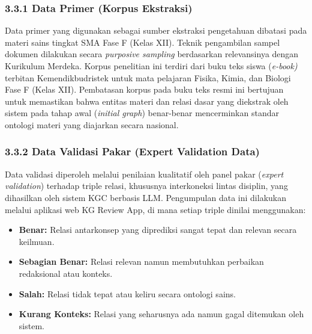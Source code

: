 \documentclass[
]{article}
\begin{document}
\hypertarget{section-3}{%
\subsubsection{\texorpdfstring{\hfill\break
}{ }}\label{section-3}}

\hypertarget{data-primer-korpus-ekstraksi}{%
\subsubsection{\texorpdfstring{\textbf{3.3.1} Data Primer (Korpus
Ekstraksi)
}{3.3.1 Data Primer (Korpus Ekstraksi) }}\label{data-primer-korpus-ekstraksi}}

Data primer yang digunakan sebagai sumber ekstraksi pengetahuan dibatasi
pada materi sains tingkat SMA Fase F (Kelas XII). Teknik pengambilan
sampel dokumen dilakukan secara \emph{purposive sampling} berdasarkan
relevansinya dengan Kurikulum Merdeka. Korpus penelitian ini terdiri
dari buku teks siswa (\emph{e-book)} terbitan Kemendikbudristek untuk
mata pelajaran Fisika, Kimia, dan Biologi Fase F (Kelas XII). Pembatasan
korpus pada buku teks resmi ini bertujuan untuk memastikan bahwa entitas
materi dan relasi dasar yang diekstrak oleh sistem pada tahap awal
(\emph{initial graph}) benar-benar mencerminkan standar ontologi materi
yang diajarkan secara nasional.

\hypertarget{data-validasi-pakar-expert-validation-data}{%
\subsubsection{\texorpdfstring{3.3.2 Data Validasi Pakar (Expert
Validation Data)
}{3.3.2 Data Validasi Pakar (Expert Validation Data) }}\label{data-validasi-pakar-expert-validation-data}}

Data validasi diperoleh melalui penilaian kualitatif oleh panel pakar
(\emph{expert validation}) terhadap triple relasi, khususnya
interkoneksi lintas disiplin, yang dihasilkan oleh sistem KGC berbasis
LLM. Pengumpulan data ini dilakukan melalui aplikasi web KG Review App,
di mana setiap triple dinilai menggunakan:

\begin{itemize}
\item
  \textbf{Benar:} Relasi antarkonsep yang diprediksi sangat tepat dan
  relevan secara keilmuan.
\item
  \textbf{Sebagian Benar:} Relasi relevan namun membutuhkan perbaikan
  redaksional atau konteks.
\item
  \textbf{Salah:} Relasi tidak tepat atau keliru secara ontologi sains.
\item
  \textbf{Kurang Konteks:} Relasi yang seharusnya ada namun gagal
  ditemukan oleh sistem.
\end{itemize}
\end{document}
